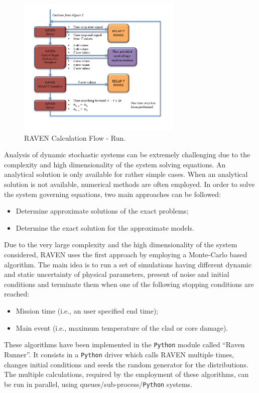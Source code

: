\documentclass{mc2013}
\begin{document}
\begin{figure} 
  \centering
     \includegraphics[width=0.7\textwidth]{figures/CalculationFlow_part_2.PNG}
  \caption{RAVEN Calculation Flow - Run.}
  \label{fig:CalcFlow2}
\end{figure}
\label{sec:pyhtonCalcDriver}
Analysis of dynamic stochastic systems can be extremely challenging due to the complexity and high dimensionality of the system solving equations. An analytical solution is only available for rather simple cases. When an analytical solution is not available, numerical methods are often employed. In order to solve the system governing equations, two main approaches can be followed:
\begin{itemize}
\item Determine approximate solutions of the exact problems;
\item Determine the exact solution for the approximate models.
\end{itemize}
Due to the very large complexity and the high dimensionality of the system considered, RAVEN uses the first approach by employing a Monte-Carlo based algorithm. 
The main idea is to run a set of simulations having different dynamic and static uncertainty of physical parameters, present of noise and initial conditions and terminate them when one of the following stopping conditions are reached:
\begin{itemize}
\item Mission time (i.e., an user specified end time);
\item Main event (i.e., maximum temperature of the clad or core damage).
\end{itemize}
These algorithms have been implemented in the \verb!Python! module called ``Raven Runner''. It consists in a \verb!Python! driver which calls RAVEN multiple times, changes initial conditions and seeds the random generator for the distributions.
The multiple calculations, required by the employment of these algorithms, can be run in parallel, using queues/sub-process/\verb!Python! systems.  
\end{document}
